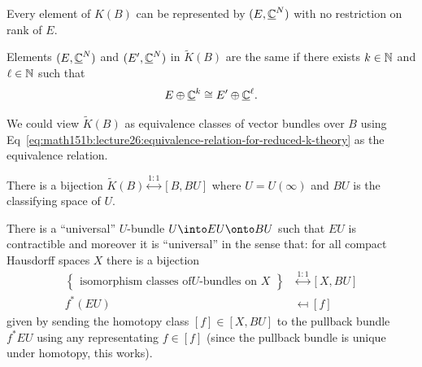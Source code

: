 
\lecture{}

\begin{remark}
Every element of $K(B)$ can be represented by
$(E,\underline{\mathbb{C}}^{N})$ with no restriction on rank of $E$.
\end{remark}

\begin{node}
Elements $(E,\underline{\mathbb{C}}^{N})$ and
$(E',\underline{\mathbb{C}}^{N})$ in $\widetilde{K}(B)$ are the same if
there exists $k\in\mathbb{N}$ and $\ell\in\mathbb{N}$ such that
\begin{equation}\label{eq:math151b:lecture26:equivalence-relation-for-reduced-k-theory}
E\oplus\underline{\mathbb{C}}^{k}\cong E'\oplus\underline{\mathbb{C}}^{\ell}.
\end{equation}
\end{node}

\begin{node}
We could view $\widetilde{K}(B)$ as equivalence classes of vector
bundles over $B$ using Eq~\eqref{eq:math151b:lecture26:equivalence-relation-for-reduced-k-theory}
as the equivalence relation.
\end{node}

\begin{claim}
There is a bijection $\widetilde{K}(B)\stackrel{1:1}{\longleftrightarrow}[B,BU]$
where $U=U(\infty)$ and $BU$ is the classifying space of $U$.
\end{claim}

\begin{recall}
There is a ``universal'' $U$-bundle $U\into EU\onto BU$ such that $EU$
is contractible and moreover it is ``universal'' in the sense that: for
all compact Hausdorff spaces $X$ there is a bijection
\begin{equation*}
\begin{split}
\left\{\begin{matrix}\mbox{isomorphism classes of}
\mbox{$U$-bundles on }X
\end{matrix}\right\}&\stackrel{1:1}{\longleftrightarrow} [X,BU]\\
f^{*}(EU) & \mapsfrom [f]
\end{split}
\end{equation*}
given by sending the homotopy class $[f]\in[X,BU]$ to the pullback
bundle $f^{*}EU$ using any representating $f\in[f]$ (since the
pullback bundle is unique under homotopy, this works).
\end{recall}

